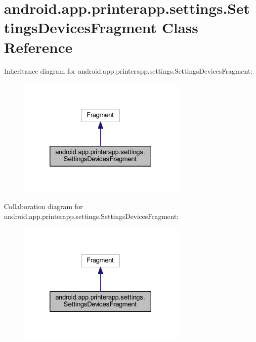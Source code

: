 \hypertarget{classandroid_1_1app_1_1printerapp_1_1settings_1_1_settings_devices_fragment}{}\section{android.\+app.\+printerapp.\+settings.\+Settings\+Devices\+Fragment Class Reference}
\label{classandroid_1_1app_1_1printerapp_1_1settings_1_1_settings_devices_fragment}


Inheritance diagram for android.\+app.\+printerapp.\+settings.\+Settings\+Devices\+Fragment\+:
\nopagebreak
\begin{figure}[H]
\begin{center}
\leavevmode
\includegraphics[width=233pt]{classandroid_1_1app_1_1printerapp_1_1settings_1_1_settings_devices_fragment__inherit__graph}
\end{center}
\end{figure}


Collaboration diagram for android.\+app.\+printerapp.\+settings.\+Settings\+Devices\+Fragment\+:
\nopagebreak
\begin{figure}[H]
\begin{center}
\leavevmode
\includegraphics[width=233pt]{classandroid_1_1app_1_1printerapp_1_1settings_1_1_settings_devices_fragment__coll__graph}
\end{center}
\end{figure}
